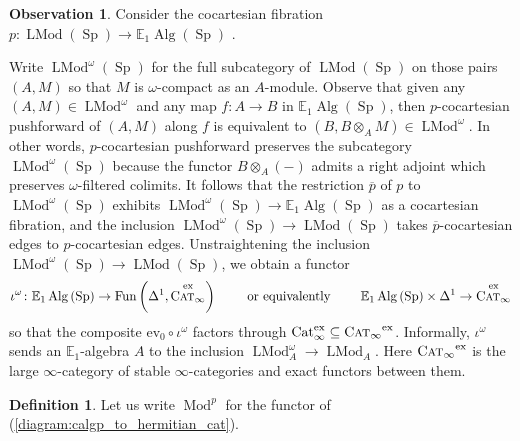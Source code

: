\documentclass{article}
\DeclareMathOperator{\Alg}{Alg}
\DeclareMathOperator{\Cat}{Cat} %
\DeclareMathOperator{\CAT}{C\normalfont\textsc{at}_\infty} %
\DeclareMathOperator{\Catex}{\Cat_\infty^{ex}} %
\DeclareMathOperator{\Fun}{Fun} %
\DeclareMathOperator{\Mod}{Mod} %
\DeclareMathOperator{\LMod}{LMod} %
\DeclareMathOperator{\Spectra}{Sp} %
\newcommand{\EE}{\mathbb{E}}
\newcommand{\ev}{\mathrm{ev}}
\theoremstyle{definition}
\newtheorem{definition}[equation]{Definition}
\newtheorem{observation}[equation]{Observation}
\begin{document}
\begin{observation}\label{obs:cpct_modules_to_all_modules}
    Consider the cocartesian fibration $ p \colon \LMod\left(\Spectra\right) \to \EE_1\Alg\left(\Spectra\right) $ \cite[Corollary 4.2.3.7(3)]{LurHA}. 

    Write $ \LMod^\omega\left(\Spectra\right) $ for the full subcategory of $ \LMod\left(\Spectra\right) $ on those pairs $ (A, M) $ so that $ M $ is $ \omega $-compact as an $ A $-module. 
    Observe that given any $ (A, M) \in \LMod^\omega $ and any map $ f \colon A \to B $ in $ \EE_1 \Alg\left(\Spectra\right) $, then $ p $-cocartesian pushforward of $ (A,M) $ along $ f $ is equivalent to $ (B,B \otimes_A M) \in \LMod^\omega $. 
    In other words, $ p $-cocartesian pushforward preserves the subcategory $ \LMod^\omega\left(\Spectra\right) $ because the functor $ B \otimes_A (-) $ admits a right adjoint which preserves $ \omega $-filtered colimits. 
    It follows that the restriction $ \overline{p} $ of $ p $ to $ \LMod^\omega\left(\Spectra\right) $ exhibits $ \LMod^\omega\left(\Spectra\right) \to \EE_1\Alg\left(\Spectra\right) $ as a cocartesian fibration, and the inclusion $ \LMod^\omega\left(\Spectra\right) \to \LMod\left(\Spectra\right) $ takes $ \overline{p} $-cocartesian edges to $ p $-cocartesian edges. 
    Unstraightening the inclusion $ \LMod^\omega\left(\Spectra\right) \to \LMod\left(\Spectra\right) $, we obtain a functor 
    \begin{equation*}
        \iota^\omega \colon \EE_1\Alg\left(\Spectra\right) \to \Fun\left(\Delta^1,\CAT^{\mathrm{ex}}\right) \qquad \text{ or equivalently } \qquad \EE_1\Alg\left(\Spectra\right) \times \Delta^1 \to \CAT^{\mathrm{ex}}
    \end{equation*}
    so that the composite $ \ev_0 \circ \iota^\omega $ factors through $ \Catex \subseteq \CAT^{\mathrm{ex}} $. 
    Informally, $ \iota^\omega $ sends an $ \EE_1 $-algebra $ A $ to the inclusion $ \LMod^\omega_A \to \LMod_A $. 
    Here $ \CAT^{\mathrm{ex}} $ is the large $ \infty $-category of stable $ \infty $-categories and exact functors between them. 
\end{observation}
\begin{definition}\label{defn:calgp_to_hermitian_cat}
    Let us write $ \Mod^p $ for the functor of (\ref{diagram:calgp_to_hermitian_cat}). 
\end{definition}
\end{document}
